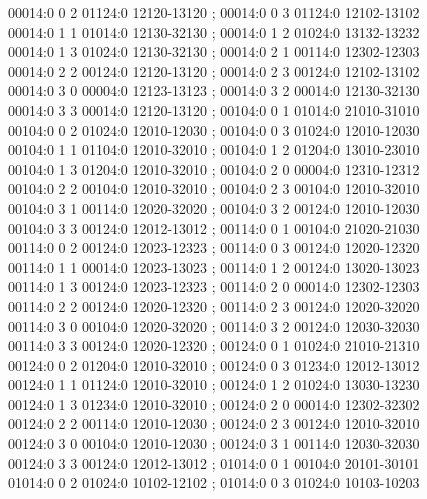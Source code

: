 \documentclass[11pt]{article}
\theoremstyle{remark}
\numberwithin{equation}{section}
\begin{document}
\begin{flushleft}
00014:0 0 2 01124:0 12120-13120 ; 00014:0 0 3 01124:0 12102-13102\\
00014:0 1 1 01014:0 12130-32130 ; 00014:0 1 2 01024:0 13132-13232\\
00014:0 1 3 01024:0 12130-32130 ; 00014:0 2 1 00114:0 12302-12303\\
00014:0 2 2 00124:0 12120-13120 ; 00014:0 2 3 00124:0 12102-13102\\
00014:0 3 0 00004:0 12123-13123 ; 00014:0 3 2 00014:0 12130-32130\\
00014:0 3 3 00014:0 12120-13120 ; 00104:0 0 1 01014:0 21010-31010\\
00104:0 0 2 01024:0 12010-12030 ; 00104:0 0 3 01024:0 12010-12030\\
00104:0 1 1 01104:0 12010-32010 ; 00104:0 1 2 01204:0 13010-23010\\
00104:0 1 3 01204:0 12010-32010 ; 00104:0 2 0 00004:0 12310-12312\\
00104:0 2 2 00104:0 12010-32010 ; 00104:0 2 3 00104:0 12010-32010\\
00104:0 3 1 00114:0 12020-32020 ; 00104:0 3 2 00124:0 12010-12030\\
00104:0 3 3 00124:0 12012-13012 ; 00114:0 0 1 00104:0 21020-21030\\
00114:0 0 2 00124:0 12023-12323 ; 00114:0 0 3 00124:0 12020-12320\\
00114:0 1 1 00014:0 12023-13023 ; 00114:0 1 2 00124:0 13020-13023\\
00114:0 1 3 00124:0 12023-12323 ; 00114:0 2 0 00014:0 12302-12303\\
00114:0 2 2 00124:0 12020-12320 ; 00114:0 2 3 00124:0 12020-32020\\
00114:0 3 0 00104:0 12020-32020 ; 00114:0 3 2 00124:0 12030-32030\\
00114:0 3 3 00124:0 12020-12320 ; 00124:0 0 1 01024:0 21010-21310\\
00124:0 0 2 01204:0 12010-32010 ; 00124:0 0 3 01234:0 12012-13012\\
00124:0 1 1 01124:0 12010-32010 ; 00124:0 1 2 01024:0 13030-13230\\
00124:0 1 3 01234:0 12010-32010 ; 00124:0 2 0 00014:0 12302-32302\\
00124:0 2 2 00114:0 12010-12030 ; 00124:0 2 3 00124:0 12010-32010\\
00124:0 3 0 00104:0 12010-12030 ; 00124:0 3 1 00114:0 12030-32030\\
00124:0 3 3 00124:0 12012-13012 ; 01014:0 0 1 00104:0 20101-30101\\
01014:0 0 2 01024:0 10102-12102 ; 01014:0 0 3 01024:0 10103-10203\\

\end{flushleft}
\end{document}
